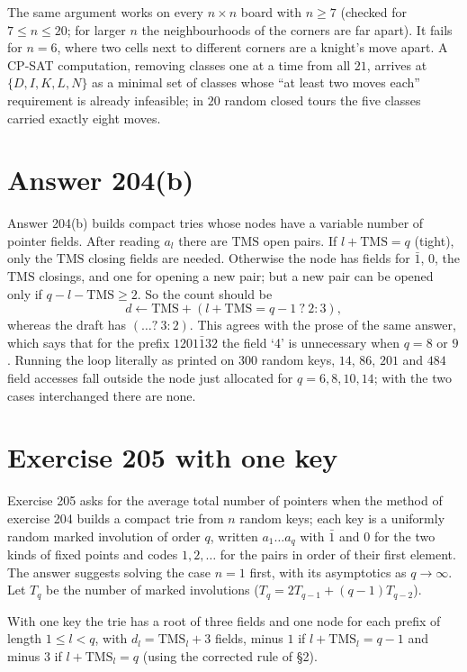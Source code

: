 \documentclass[11pt]{amsart}
\theoremstyle{remark}
\begin{document}
The same argument works on every $n\times n$ board with $n\ge7$ (checked for $7\le n\le20$; for larger $n$ the
neighbourhoods of the corners are far apart). It fails for $n=6$, where two cells next to different corners are a
knight's move apart. A CP-SAT computation, removing classes one at a time from all $21$, arrives at
$\{D,I,K,L,N\}$ as a minimal set of classes whose ``at least two moves each'' requirement is already infeasible;
in $20$ random closed tours the five classes carried exactly eight moves.

\section{Answer 204(b)}
Answer 204(b) builds compact tries whose nodes have a variable number of pointer fields. After reading $a_l$ there are
$\mathrm{TMS}$ open pairs. If $l+\mathrm{TMS}=q$ (tight), only the $\mathrm{TMS}$ closing fields are needed. Otherwise
the node has fields for $\bar1$, $0$, the $\mathrm{TMS}$ closings, and one for opening a new pair; but a new pair can be
opened only if $q-l-\mathrm{TMS}\ge2$. So the count should be
\[d\gets\mathrm{TMS}+(l+\mathrm{TMS}=q-1\ ?\ 2:3),\]
whereas the draft has $(\dots ?\ 3:2)$. This agrees with the prose of the same answer, which says that for the prefix
$1201\bar132$ the field `4' is unnecessary when $q=8$ or $9$. Running the loop literally as printed on $300$ random
keys, $14$, $86$, $201$ and $484$ field accesses fall outside the node just allocated for $q=6,8,10,14$; with the two
cases interchanged there are none.

\section{Exercise 205 with one key}
Exercise 205 asks for the average total number of pointers when the method of exercise 204 builds a compact trie
from $n$ random keys; each key is a uniformly random marked involution of order $q$, written $a_1\ldots a_q$ with
$\bar1$ and $0$ for the two kinds of fixed points and codes $1,2,\dots$ for the pairs in order of their first
element. The answer suggests solving the case $n=1$ first, with its asymptotics as $q\to\infty$. Let $T_q$ be the
number of marked involutions ($T_q=2T_{q-1}+(q-1)T_{q-2}$).

With one key the trie has a root of three fields and one node for each prefix of length $1\le l<q$, with
$d_l=\mathrm{TMS}_l+3$ fields, minus $1$ if $l+\mathrm{TMS}_l=q-1$ and minus $3$ if $l+\mathrm{TMS}_l=q$ (using the
corrected rule of \S2).
\end{document}

